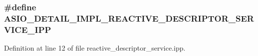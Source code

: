 \subsubsection[{A\+S\+I\+O\+\_\+\+D\+E\+T\+A\+I\+L\+\_\+\+I\+M\+P\+L\+\_\+\+R\+E\+A\+C\+T\+I\+V\+E\+\_\+\+D\+E\+S\+C\+R\+I\+P\+T\+O\+R\+\_\+\+S\+E\+R\+V\+I\+C\+E\+\_\+\+I\+P\+P}]{\setlength{\rightskip}{0pt plus 5cm}\#define A\+S\+I\+O\+\_\+\+D\+E\+T\+A\+I\+L\+\_\+\+I\+M\+P\+L\+\_\+\+R\+E\+A\+C\+T\+I\+V\+E\+\_\+\+D\+E\+S\+C\+R\+I\+P\+T\+O\+R\+\_\+\+S\+E\+R\+V\+I\+C\+E\+\_\+\+I\+P\+P}\label{reactive__descriptor__service_8ipp_a72fb79797d3070a836d3c05aa70d69ee}


Definition at line 12 of file reactive\+\_\+descriptor\+\_\+service.\+ipp.

